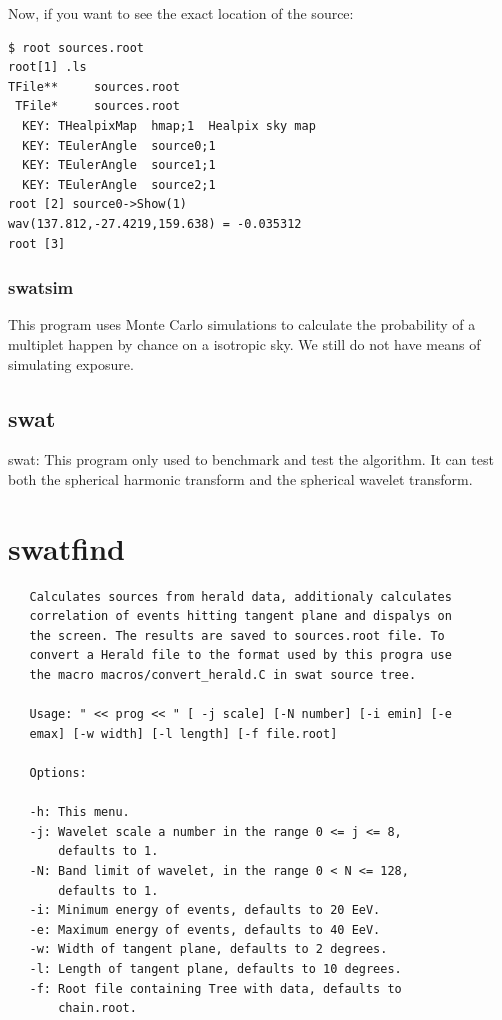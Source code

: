 \documentclass[12pt]{article}
\begin{document}
Now, if you want to see the exact location of the source:
{ \color{brown}
\begin{lstlisting}
$ root sources.root
root[1] .ls
TFile**		sources.root	
 TFile*		sources.root	
  KEY: THealpixMap	hmap;1	Healpix sky map
  KEY: TEulerAngle	source0;1	
  KEY: TEulerAngle	source1;1	
  KEY: TEulerAngle	source2;1	
root [2] source0->Show(1)
wav(137.812,-27.4219,159.638) = -0.035312
root [3] 
\end{lstlisting}
}
\subsubsection{swatsim}
This program uses Monte Carlo simulations to calculate the probability of a multiplet happen by 
chance on a isotropic sky. We still do not have means of simulating exposure.
\subsection{swat}
swat: This program only used to benchmark and test the algorithm. It can test
both the spherical harmonic transform and the spherical wavelet transform.

\appendix
\section{swatfind}
{ \color{brown}
   \begin{lstlisting}
   Calculates sources from herald data, additionaly calculates
   correlation of events hitting tangent plane and dispalys on
   the screen. The results are saved to sources.root file. To
   convert a Herald file to the format used by this progra use
   the macro macros/convert_herald.C in swat source tree.
   
   Usage: " << prog << " [ -j scale] [-N number] [-i emin] [-e
   emax] [-w width] [-l length] [-f file.root]

   Options:

   -h: This menu.
   -j: Wavelet scale a number in the range 0 <= j <= 8,
       defaults to 1.
   -N: Band limit of wavelet, in the range 0 < N <= 128,
       defaults to 1.
   -i: Minimum energy of events, defaults to 20 EeV.
   -e: Maximum energy of events, defaults to 40 EeV.
   -w: Width of tangent plane, defaults to 2 degrees.
   -l: Length of tangent plane, defaults to 10 degrees.
   -f: Root file containing Tree with data, defaults to
       chain.root.
   \end{lstlisting}
}
\end{document}
